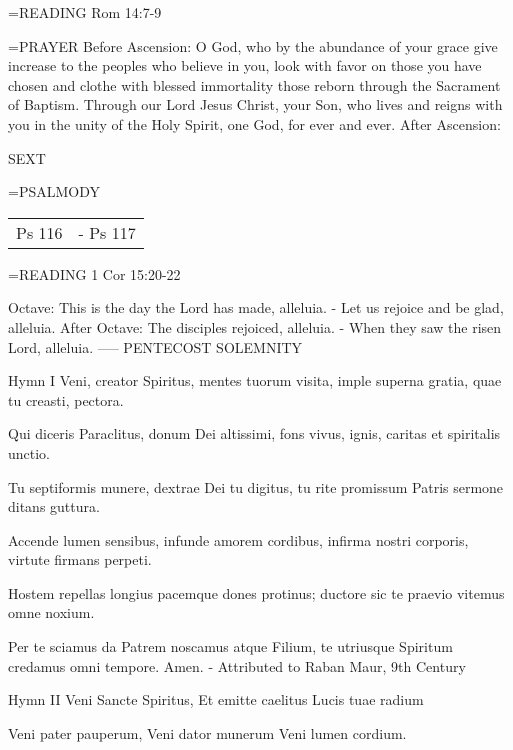 \hangindent=\parindent \small{\uppercase{READING}}    Rom 14:7-9 \textbf{   \\}

\hangindent=\parindent \small{PRAYER }
Before Ascension:	O God, who by the abundance of your grace give increase to the peoples who believe in you, look with favor on those you have chosen and clothe with blessed immortality those reborn through the Sacrament of Baptism. Through our Lord Jesus Christ, your Son, who lives and reigns with you in the unity of the Holy Spirit, one God, for ever and ever.
After Ascension:	

\begin{flushleft}\normalsize SEXT\\\end{flushleft}
\hangindent=\parindent \small{PSALMODY}
\begin{center}
\begin{tabular}{ l l }
Ps 116 &  - Ps 117\\
\end{tabular}
\end{center}		

\hangindent=\parindent \small{\uppercase{READING}}    1 Cor 15:20-22 \textbf{   \\}

Octave:	This is the day the Lord has made, alleluia.
		- Let us rejoice and be glad, alleluia.
After Octave:	The disciples rejoiced, alleluia.
		- When they saw the risen Lord, alleluia.
-----
PENTECOST
SOLEMNITY

Hymn I
Veni, creator Spiritus,
mentes tuorum visita,
imple superna gratia,
quae tu creasti, pectora.

Qui diceris Paraclitus,
donum Dei altissimi,
fons vivus, ignis, caritas
et spiritalis unctio.

Tu septiformis munere,
dextrae Dei tu digitus,
tu rite promissum Patris
sermone ditans guttura.

Accende lumen sensibus,
infunde amorem cordibus,
infirma nostri corporis,
virtute firmans perpeti.

Hostem repellas longius
pacemque dones protinus;
ductore sic te praevio
vitemus omne noxium.

Per te sciamus da Patrem
noscamus atque Filium,
te utriusque Spiritum
credamus omni tempore. Amen.
- Attributed to Raban Maur, 9th Century

Hymn II
Veni Sancte Spiritus,
Et emitte caelitus
Lucis tuae radium

Veni pater pauperum,
Veni dator munerum
Veni lumen cordium.


